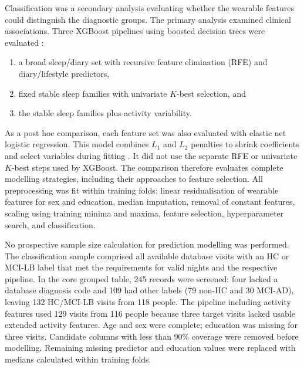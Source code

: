 \documentclass[referee,pdflatex,sn-vancouver-num]{sn-jnl}
\begin{document}
Classification was a secondary analysis evaluating whether the wearable
features could distinguish the diagnostic groups. The primary analysis
examined clinical associations. Three XGBoost pipelines using boosted decision trees were evaluated
\cite{chen2016xgboost}: 
\begin{enumerate}
  \item a broad sleep/diary set with recursive feature elimination (RFE) and diary/lifestyle predictors,
  \item fixed stable sleep families with univariate $K$-best selection, and
  \item the stable sleep families plus activity variability.
\end{enumerate}
As a post hoc comparison, each feature set was also evaluated with elastic net
logistic regression. This model combines $L_1$ and $L_2$ penalties to shrink
coefficients and select variables during fitting \cite{zou2005elasticnet}.
It did not use the separate RFE or univariate $K$-best steps used by XGBoost.
The comparison therefore evaluates complete modelling strategies, including
their approaches to feature selection.
All preprocessing was fit within training folds:
linear residualisation of wearable features for sex and education, median
imputation, removal of constant features, scaling using training minima and maxima, feature selection,
hyperparameter search, and classification.

No prospective sample size calculation for prediction modelling was performed. The
classification sample comprised all available database visits with an HC or
MCI-LB label that met the requirements for valid nights and the respective pipeline.
In the core grouped table, 245 records were screened: four lacked a database
diagnosis code and 109 had other labels (79 non-HC and 30 MCI-AD), leaving
132 HC/MCI-LB visits from 118 people. The pipeline including activity features used
129 visits from 116 people because three target visits lacked usable extended
activity features. Age and sex were complete; education was missing for three
visits. Candidate columns with less than 90\% coverage were removed before
modelling. Remaining missing predictor and education values were replaced with
medians calculated within training folds.
\end{document}
